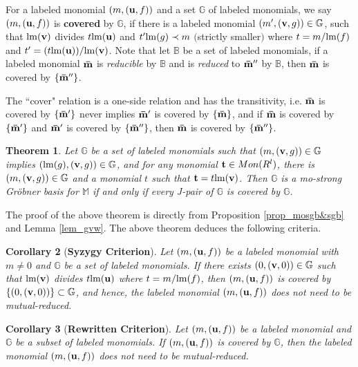\documentclass[final, number, 3p,12pt]{elsarticle}
\newtheorem{theorem}{Theorem}[section]
\newtheorem{cor}[theorem]{Corollary}
\def\B{{\mathbb{B}}}
\def\G{{\mathbb{G}}}
\def\M{{\mathbb M}}
\def\brm{{\bf \bar{m}}}
\def\lm{{\rm lm}} %
\def\t{{\bf t}}
\def\u{{\bf u}}
\def\v{{\bf v}}
\begin{document}
For a labeled monomial $(m, (\u, f))$ and a set $\G$ of labeled monomials, we say $(m, (\u, f))$ is {\bf covered} by $\G$, if there is a labeled monomial $(m', (\v, g))\in \G$, such that $\lm(\v)$ divides $t\lm(\u)$ and $t'\lm(g) \prec m$ $($strictly smaller$)$ where $t=m/\lm(f)$ and $t' = (t\lm(\u))/\lm(\v)$. Note that let $\B$ be a set of labeled monomials, if a labeled monomial $\brm$ is {\em reducible} by $\B$ and is {\em reduced} to $\brm''$ by $\B$, then $\brm$ is covered by $\{\brm''\}$.


The ``cover" relation is a one-side relation and has the transitivity, i.e. $\brm$ is covered by $\{\brm'\}$ never implies $\brm'$ is covered by $\{\brm\}$, and if $\brm$ is covered by $\{\brm'\}$ and $\brm'$ is covered by $\{\brm''\}$, then $\brm$ is covered by $\{\brm''\}$. 


\begin{theorem}\label{thm_main}
Let $\G$ be a set of labeled monomials such that $(m, (\v, g)) \in \G$ implies $(\lm(g), (\v, g)) \in \G$, and for any monomial $\t \in Mon(R^l)$, there is $(m, (\v, g))\in \G$ and a monomial $t$ such that $\t = t\lm(\v)$. Then $\G$ is a mo-strong Gr\"obner basis for $\M$ if and only if every J-pair of $\G$ is covered by $\G$.
\end{theorem}

The proof of the above theorem is directly from Proposition \ref{prop_mosgb&sgb} and Lemma \ref{lem_gvw}. The above theorem deduces the following criteria.

\begin{cor}[{\bf Syzygy Criterion}] \label{cor_syzygy}
Let $(m, (\u, f))$ be a labeled monomial with $m\not=0$ and $\G$ be a set of labeled monomials. If there exists $(0, (\v, 0)) \in \G$ such that $\lm(\v)$ divides $t\lm(\u)$ where $t = m/\lm(f)$, then $(m, (\u, f))$ is covered by $\{(0, (\v, 0))\} \subset \G$, and hence, the labeled monomial $(m, (\u, f))$ does not need to be mutual-reduced.
\end{cor}


\begin{cor}[{\bf Rewritten Criterion}] \label{cor_rewritten}
Let $(m, (\u, f))$ be a labeled monomial and $\G$ be a subset of labeled monomials. If $(m, (\u, f))$ is covered by $\G$, then the labeled monomial $(m, (\u, f))$ does not need to be mutual-reduced.
\end{cor}
\end{document}
